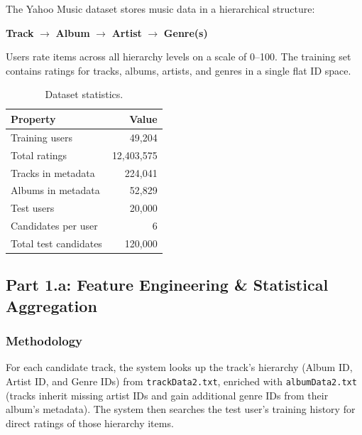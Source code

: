 \documentclass[12pt]{article}
\begin{document}
The Yahoo Music dataset stores music data in a hierarchical structure:

\begin{center}
\textbf{Track} $\rightarrow$ \textbf{Album} $\rightarrow$ \textbf{Artist} $\rightarrow$ \textbf{Genre(s)}
\end{center}

Users rate items across all hierarchy levels on a scale of 0--100. The training set contains ratings for tracks, albums, artists, and genres in a single flat ID space.

\begin{table}[H]
	\centering
	\begin{tabular}{lr}
		\toprule
		\textbf{Property} & \textbf{Value} \\
		\midrule
		Training users          & 49,204 \\
		Total ratings           & 12,403,575 \\
		Tracks in metadata      & 224,041 \\
		Albums in metadata      & 52,829 \\
		Test users              & 20,000 \\
		Candidates per user     & 6 \\
		Total test candidates   & 120,000 \\
		\bottomrule
	\end{tabular}
	\caption{Dataset statistics.}\label{tab:dataset}
\end{table}

\newpage
\subsection{Part 1.a: Feature Engineering \& Statistical Aggregation}

\subsubsection{Methodology}

For each candidate track, the system looks up the track's hierarchy (Album ID, Artist ID, and Genre IDs) from \texttt{trackData2.txt}, enriched with \texttt{albumData2.txt} (tracks inherit missing artist IDs and gain additional genre IDs from their album's metadata). The system then searches the test user's training history for direct ratings of those hierarchy items.
\end{document}
